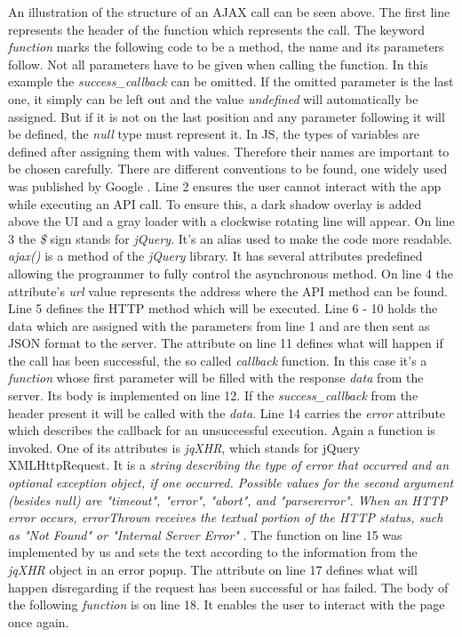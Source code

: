 An illustration of the structure of an AJAX call can be seen above. The first line represents the header of the function which represents the call. The keyword \textit{function} marks the following code to be a method, the name and its parameters follow. Not all parameters have to be given when calling the function. In this example the \textit{success\_callback} can be omitted. If the omitted parameter is the last one, it simply can be left out and the value \textit{undefined} will automatically be assigned. But if it is not on the last position and any parameter following it will be defined, the \textit{null} type must represent it. In JS, the types of variables are defined after assigning them with values. Therefore their names are important to be chosen carefully. There are different conventions to be found, one widely used was published by Google \cite{javascript-convention}. Line 2 ensures the user cannot interact with the app while executing an API call. To ensure this, a dark shadow overlay is added above the UI and a gray loader with a clockwise rotating line will appear. On line 3 the \textit{\$} sign stands for \textit{jQuery}. It’s an alias used to make the code more readable. \textit{ajax()} is a method of the \textit{jQuery} library. It has several attributes predefined allowing the programmer to fully control the asynchronous method. On line 4 the attribute's \textit{url} value represents the address where the API method can be found. Line 5 defines the HTTP method which will be executed. Line 6 - 10 holds the data which are assigned with the parameters from line 1 and are then sent as JSON format to the server. The attribute on line 11 defines what will happen if the call has been successful, the so called \textit{callback} function. In this case it’s a \textit{function} whose first parameter will be filled with the response \textit{data} from the server. Its body is implemented on line 12. If the \textit{success\_callback} from the header present it will be called with the \textit{data}. Line 14 carries the \textit{error} attribute which describes the callback for an unsuccessful execution. Again a function is invoked. One of its attributes is \textit{jqXHR}, which stands for jQuery XMLHttpRequest. It is a \textit{string describing the type of error that occurred and an optional exception object, if one occurred. Possible values for the second argument (besides null) are "timeout", "error", "abort", and "parsererror". When an HTTP error occurs, errorThrown receives the textual portion of the HTTP status, such as "Not Found" or "Internal Server Error"} \cite{jquery-documentation-ajax}. The function on line 15 was implemented by us and sets the text according to the information from the \textit{jqXHR} object in an error popup. The attribute on line 17 defines what will happen disregarding if the request has been successful or has failed. The body of the following \textit{function} is on line 18. It enables the user to interact with the page once again. 
